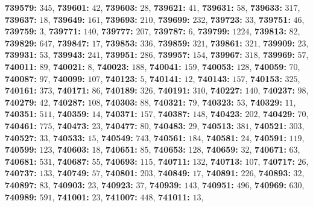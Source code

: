 \textsf{\bfseries 739579:} $345$, \textsf{\bfseries 739601:} $42$, \textsf{\bfseries 739603:} $28$, \textsf{\bfseries 739621:} $41$, \textsf{\bfseries 739631:} $58$, \textsf{\bfseries 739633:} $317$, \textsf{\bfseries 739637:} $18$, \textsf{\bfseries 739649:} $161$, \textsf{\bfseries 739693:} $210$, \textsf{\bfseries 739699:} $232$, \textsf{\bfseries 739723:} $33$, \textsf{\bfseries 739751:} $46$, \textsf{\bfseries 739759:} $3$, \textsf{\bfseries 739771:} $140$, \textsf{\bfseries 739777:} $207$, \textsf{\bfseries 739787:} $6$, \textsf{\bfseries 739799:} $1224$, \textsf{\bfseries 739813:} $82$, \textsf{\bfseries 739829:} $647$, \textsf{\bfseries 739847:} $17$, \textsf{\bfseries 739853:} $336$, \textsf{\bfseries 739859:} $321$, \textsf{\bfseries 739861:} $321$, \textsf{\bfseries 739909:} $23$, \textsf{\bfseries 739931:} $53$, \textsf{\bfseries 739943:} $241$, \textsf{\bfseries 739951:} $286$, \textsf{\bfseries 739957:} $154$, \textsf{\bfseries 739967:} $318$, \textsf{\bfseries 739969:} $57$, \textsf{\bfseries 740011:} $89$, \textsf{\bfseries 740021:} $8$, \textsf{\bfseries 740023:} $188$, \textsf{\bfseries 740041:} $159$, \textsf{\bfseries 740053:} $128$, \textsf{\bfseries 740059:} $70$, \textsf{\bfseries 740087:} $97$, \textsf{\bfseries 740099:} $107$, \textsf{\bfseries 740123:} $5$, \textsf{\bfseries 740141:} $12$, \textsf{\bfseries 740143:} $157$, \textsf{\bfseries 740153:} $325$, \textsf{\bfseries 740161:} $373$, \textsf{\bfseries 740171:} $86$, \textsf{\bfseries 740189:} $326$, \textsf{\bfseries 740191:} $310$, \textsf{\bfseries 740227:} $140$, \textsf{\bfseries 740237:} $98$, \textsf{\bfseries 740279:} $42$, \textsf{\bfseries 740287:} $108$, \textsf{\bfseries 740303:} $88$, \textsf{\bfseries 740321:} $79$, \textsf{\bfseries 740323:} $53$, \textsf{\bfseries 740329:} $11$, \textsf{\bfseries 740351:} $511$, \textsf{\bfseries 740359:} $14$, \textsf{\bfseries 740371:} $157$, \textsf{\bfseries 740387:} $148$, \textsf{\bfseries 740423:} $202$, \textsf{\bfseries 740429:} $70$, \textsf{\bfseries 740461:} $775$, \textsf{\bfseries 740473:} $23$, \textsf{\bfseries 740477:} $80$, \textsf{\bfseries 740483:} $29$, \textsf{\bfseries 740513:} $381$, \textsf{\bfseries 740521:} $303$, \textsf{\bfseries 740527:} $33$, \textsf{\bfseries 740533:} $15$, \textsf{\bfseries 740549:} $743$, \textsf{\bfseries 740561:} $184$, \textsf{\bfseries 740581:} $24$, \textsf{\bfseries 740591:} $119$, \textsf{\bfseries 740599:} $123$, \textsf{\bfseries 740603:} $18$, \textsf{\bfseries 740651:} $85$, \textsf{\bfseries 740653:} $128$, \textsf{\bfseries 740659:} $32$, \textsf{\bfseries 740671:} $63$, \textsf{\bfseries 740681:} $531$, \textsf{\bfseries 740687:} $55$, \textsf{\bfseries 740693:} $115$, \textsf{\bfseries 740711:} $132$, \textsf{\bfseries 740713:} $107$, \textsf{\bfseries 740717:} $26$, \textsf{\bfseries 740737:} $133$, \textsf{\bfseries 740749:} $57$, \textsf{\bfseries 740801:} $203$, \textsf{\bfseries 740849:} $17$, \textsf{\bfseries 740891:} $226$, \textsf{\bfseries 740893:} $32$, \textsf{\bfseries 740897:} $83$, \textsf{\bfseries 740903:} $23$, \textsf{\bfseries 740923:} $37$, \textsf{\bfseries 740939:} $143$, \textsf{\bfseries 740951:} $496$, \textsf{\bfseries 740969:} $630$, \textsf{\bfseries 740989:} $591$, \textsf{\bfseries 741001:} $23$, \textsf{\bfseries 741007:} $448$, \textsf{\bfseries 741011:} $13$, 
